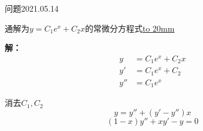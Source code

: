 \begin{mybox}{问题2021.05.14}
	
	\qquad 通解为$y=C_{1}e^{x} +C_{2}x$的常微分方程式\underline{\hbox to 20mm{}}
\end{mybox}
\noindent
\textbf{解：}
\begin{align}
	y&=C_{1}e^{x}+C_{2}x\\
	y'&=C_{1}e^{x}+C_{2}\\
	y''&=C_{1}e^{x}
\end{align}

消去$C_{1},C_{2}$
$$y=y''+(y'-y'')x$$
$$(1-x)y''+xy'-y=0$$